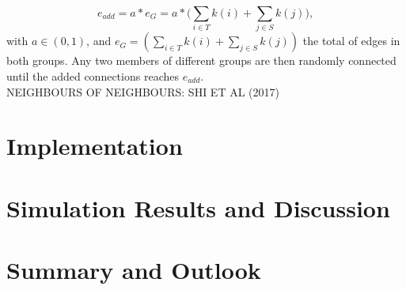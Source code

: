 \documentclass[11pt]{article}
\begin{document}
\begin{equation}
e_{add}=a*e_{G}=a*\bigg(\sum_{i\in{T}}k(i) + \sum_{j\in{S}}k(j)\bigg),
\end{equation}
 with \(a\in{(0,1)}\), and \(e_{G}=(\sum_{i\in{T}}k(i) + \sum_{j\in{S}}k(j))\) the total of edges in both groups. Any two members of different groups are then randomly connected until the added connections reaches \(e_{add}\).  \\
NEIGHBOURS OF NEIGHBOURS: SHI ET AL (2017)
\\





\section{Implementation}

\section{Simulation Results and Discussion}

\section{Summary and Outlook}









\clearpage
\end{document}
